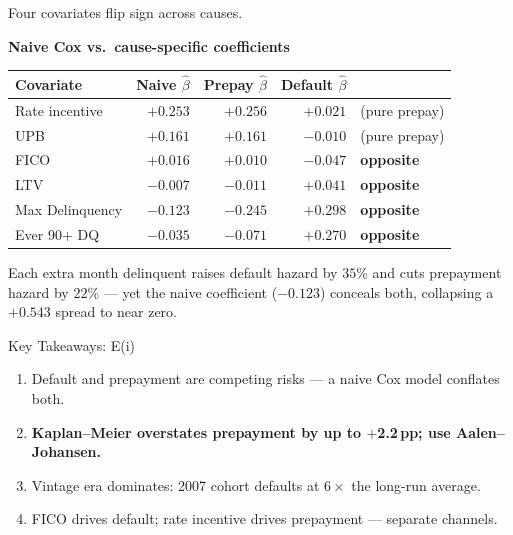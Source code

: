 \documentclass[10pt,aspectratio=169]{beamer}
\begin{document}
\begin{frame}{Four covariates flip sign across causes.}
    \vspace{0.2em}
    \begin{center}
    \small
    \textbf{Naive Cox vs.\ cause-specific coefficients}\\[4pt]
    \begin{tabular}{lrrrp{2.6cm}}
        \toprule
        \textbf{Covariate} & \textbf{Naive $\hat\beta$} & \textbf{Prepay $\hat\beta$} & \textbf{Default $\hat\beta$} & \\
        \midrule
        Rate incentive   & $+0.253$ & \textcolor{good}{$+0.256$} & $+0.021$                   & (pure prepay) \\
        UPB              & $+0.161$ & \textcolor{good}{$+0.161$} & $-0.010$                   & (pure prepay) \\
        \midrule
        FICO             & $+0.016$ & \textcolor{good}{$+0.010$} & \textcolor{bad}{$-0.047$}  & \textbf{opposite} \\
        LTV              & $-0.007$ & \textcolor{bad}{$-0.011$}  & \textcolor{good}{$+0.041$} & \textbf{opposite} \\
        Max Delinquency  & $-0.123$ & \textcolor{bad}{$-0.245$}  & \textcolor{good}{$+0.298$} & \textbf{opposite} \\
        Ever 90+ DQ      & $-0.035$ & \textcolor{bad}{$-0.071$}  & \textcolor{good}{$+0.270$} & \textbf{opposite} \\
        \bottomrule
    \end{tabular}
    \end{center}
    \vspace{0.3em}
    \begin{center}
        \small
        Each extra month delinquent raises default hazard by $35\%$ and cuts prepayment hazard by $22\%$
        --- yet the naive coefficient ($-0.123$) conceals both, collapsing a $+0.543$ spread to near zero.
    \end{center}
\end{frame}

\begin{frame}{Key Takeaways: E(i)}
    \begin{enumerate}\itemsep14pt
        \item Default and prepayment are competing risks --- a naive Cox model conflates both.
        \item \textbf{Kaplan--Meier overstates prepayment by up to $+$2.2\,pp; use Aalen--Johansen.}
        \item Vintage era dominates: 2007 cohort defaults at $6\times$ the long-run average.
        \item FICO drives default; rate incentive drives prepayment --- separate channels.
    \end{enumerate}
\end{frame}
\end{document}
